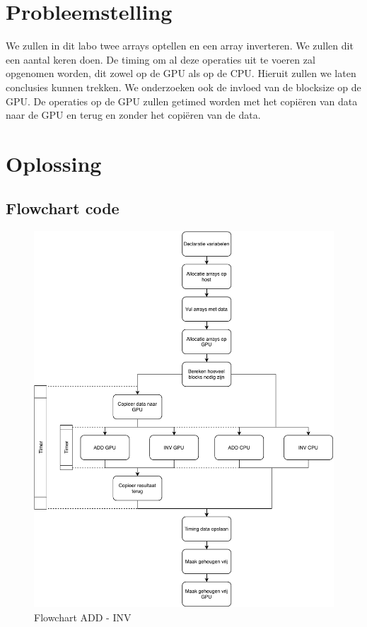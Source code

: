 \documentclass[twoside,a4paper]{article}
\begin{document}
\section{Probleemstelling}
We zullen in dit labo twee arrays optellen en een array inverteren. We zullen dit een aantal keren doen. De timing om al deze operaties uit te voeren zal opgenomen worden, dit zowel op de GPU als op de CPU. Hieruit zullen we laten conclusies kunnen trekken. We onderzoeken ook de invloed van de blocksize op de GPU. De operaties op de GPU zullen getimed worden met het copi\"eren van data naar de GPU en terug en zonder het copi\"eren van de data.


\section{Oplossing}

\subsection{Flowchart code}

\begin{figure}[H]
    \centering
    \includegraphics[width=\columnwidth]{flowchart_inv_add.pdf}
    \caption{Flowchart ADD - INV}
    \label{fig:flowchart}
\end{figure}
\end{document}
